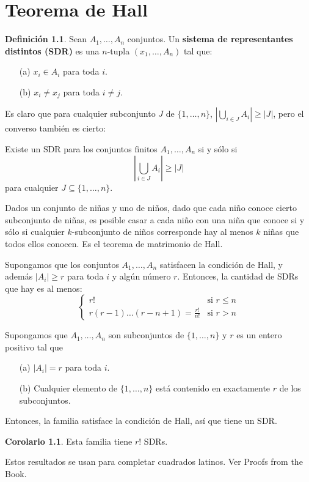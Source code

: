 \documentclass[spanish]{book}
\theoremstyle{definition}
\newtheorem*{defn}{Definición}
\newtheorem*{coro}{Corolario}
\begin{document}
\chapter{Teorema de Hall}
\begin{defn}
	Sean $A_1,\ldots,A_n$ conjuntos. Un \textbf{sistema de representantes distintos (SDR)} es una $n$-tupla $(x_1,\ldots,A_n)$ tal que:
	\begin{itemize}
		\item[(a)] $x_i\in A_i$ para toda $i$.
		\item[(b)] $x_i\neq x_j$ para toda $i\neq j$.
	\end{itemize}
\end{defn}
Es claro que para cualquier subconjunto $J$ de $\{1,\ldots,n\}$, $\left|\bigcup_{i\in J}A_i\right|\geq|J|$, pero el converso también es cierto:
\begin{teo}[de Hall]
	Existe un SDR para los conjuntos finitos $A_1,\ldots,A_n$ si y sólo si 
	\[\left|\bigcup_{i\in J}A_i\right|\geq|J|\]
	para cualquier $J\subseteq\{1,\ldots,n\}$.
\end{teo}
Dados un conjunto de niñas y uno de niños, dado que cada niño conoce cierto subconjunto de niñas, es posible casar a cada niño con una niña que conoce si y sólo si cualquier $k$-subconjunto de niños corresponde hay al menos $k$ niñas que todos ellos conocen. Es el teorema de matrimonio de Hall.
\begin{teo}
	Supongamos que los conjuntos $A_1,\ldots,A_n$ satisfacen la condición de Hall, y además $|A_i|\geq r$ para toda $i$ y algún número $r$. Entonces, la cantidad de SDRs que hay es al menos:
	\[\begin{cases}
		r!\qquad&\text{si }r\leq n\\
		r(r-1)\ldots(r-n+1)=\frac{r!}{n!}&\text{si }r>n
	\end{cases}\]
\end{teo}
\begin{teo}
	Supongamos que $A_1,\ldots,A_n$ son subconjuntos de $\{1,\ldots,n\}$ y $r$ es un entero positivo tal que
	\begin{itemize}
		\item[(a)] $|A_i|=r$ para toda $i$.
		\item[(b)] Cualquier elemento de $\{1,\ldots,n\}$ está contenido en exactamente $r$ de los subconjuntos.
	\end{itemize}
	Entonces, la familia satisface la condición de Hall, así que tiene un SDR.
\end{teo}
\begin{coro}
	Esta familia tiene $r!$ SDRs.
\end{coro}
Estos resultados se usan para completar cuadrados latinos. Ver Proofs from the Book.
\end{document}
